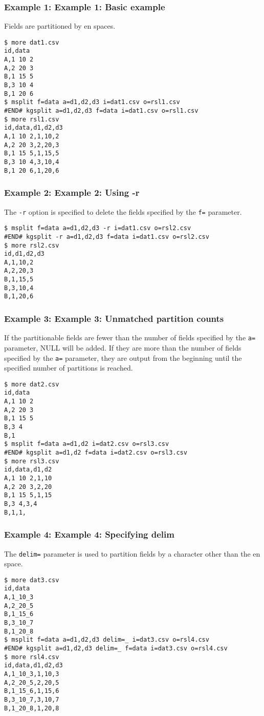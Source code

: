 \subsubsection*{Example 1: Example 1: Basic example}

Fields are partitioned by en spaces.


\begin{Verbatim}[baselinestretch=0.7,frame=single]
$ more dat1.csv
id,data
A,1 10 2
A,2 20 3
B,1 15 5
B,3 10 4
B,1 20 6
$ msplit f=data a=d1,d2,d3 i=dat1.csv o=rsl1.csv
#END# kgsplit a=d1,d2,d3 f=data i=dat1.csv o=rsl1.csv
$ more rsl1.csv
id,data,d1,d2,d3
A,1 10 2,1,10,2
A,2 20 3,2,20,3
B,1 15 5,1,15,5
B,3 10 4,3,10,4
B,1 20 6,1,20,6
\end{Verbatim}
\subsubsection*{Example 2: Example 2: Using -r}

The \verb|-r| option is specified to delete the fields specified by the \verb|f=| parameter.


\begin{Verbatim}[baselinestretch=0.7,frame=single]
$ msplit f=data a=d1,d2,d3 -r i=dat1.csv o=rsl2.csv
#END# kgsplit -r a=d1,d2,d3 f=data i=dat1.csv o=rsl2.csv
$ more rsl2.csv
id,d1,d2,d3
A,1,10,2
A,2,20,3
B,1,15,5
B,3,10,4
B,1,20,6
\end{Verbatim}
\subsubsection*{Example 3: Example 3: Unmatched partition counts}

If the partitionable fields are fewer than the number of fields specified by the \verb|a=| parameter, NULL will be added. If they are more than the number of fields specified by the \verb|a=| parameter, they are output from the beginning until the specified number of partitions is reached.


\begin{Verbatim}[baselinestretch=0.7,frame=single]
$ more dat2.csv
id,data
A,1 10 2
A,2 20 3
B,1 15 5
B,3 4
B,1
$ msplit f=data a=d1,d2 i=dat2.csv o=rsl3.csv
#END# kgsplit a=d1,d2 f=data i=dat2.csv o=rsl3.csv
$ more rsl3.csv
id,data,d1,d2
A,1 10 2,1,10
A,2 20 3,2,20
B,1 15 5,1,15
B,3 4,3,4
B,1,1,
\end{Verbatim}
\subsubsection*{Example 4: Example 4: Specifying delim}

The \verb|delim=| parameter is used to partition fields by a character other than the en space.


\begin{Verbatim}[baselinestretch=0.7,frame=single]
$ more dat3.csv
id,data
A,1_10_3
A,2_20_5
B,1_15_6
B,3_10_7
B,1_20_8
$ msplit f=data a=d1,d2,d3 delim=_ i=dat3.csv o=rsl4.csv
#END# kgsplit a=d1,d2,d3 delim=_ f=data i=dat3.csv o=rsl4.csv
$ more rsl4.csv
id,data,d1,d2,d3
A,1_10_3,1,10,3
A,2_20_5,2,20,5
B,1_15_6,1,15,6
B,3_10_7,3,10,7
B,1_20_8,1,20,8
\end{Verbatim}
